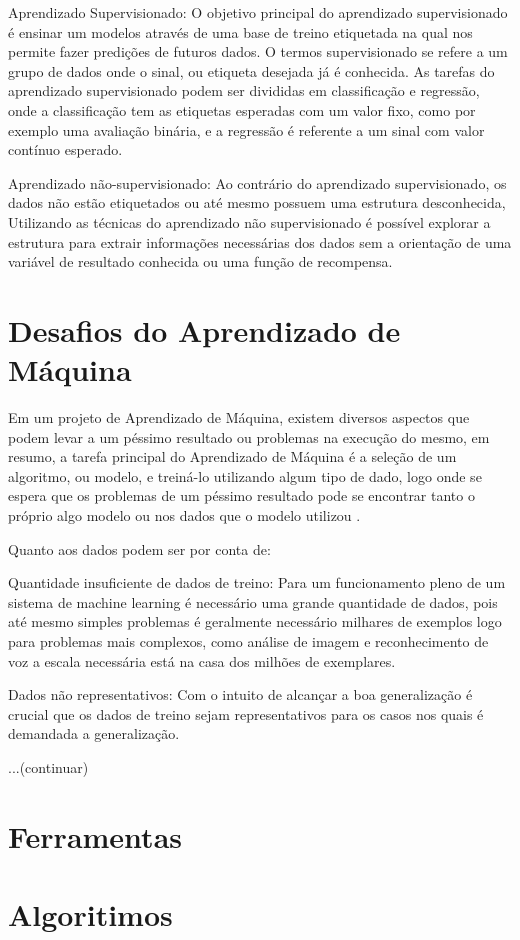 Aprendizado Supervisionado: O objetivo principal do aprendizado supervisionado é ensinar um modelos através de uma base de treino etiquetada na qual nos permite fazer predições de futuros dados. O termos supervisionado se refere a um grupo de dados onde o sinal, ou etiqueta desejada já é conhecida. As tarefas do aprendizado supervisionado podem ser divididas em classificação e regressão, onde a classificação tem as etiquetas esperadas com um valor fixo, como por exemplo uma avaliação binária, e a regressão é referente a um sinal com valor contínuo esperado.

Aprendizado não-supervisionado: Ao contrário do aprendizado supervisionado, os dados não estão etiquetados ou até mesmo possuem uma estrutura desconhecida, Utilizando as técnicas do aprendizado não supervisionado é possível explorar a estrutura para extrair informações necessárias dos dados sem a orientação de uma variável de resultado conhecida ou uma função de recompensa.

\section{Desafios do Aprendizado de Máquina}
Em um projeto de Aprendizado de Máquina, existem diversos aspectos que podem levar a um péssimo resultado ou problemas na execução do mesmo, em resumo, a tarefa principal do Aprendizado de Máquina é a seleção de um algoritmo, ou modelo, e treiná-lo utilizando algum tipo de dado, logo onde se espera que os problemas de um péssimo resultado pode se encontrar tanto o próprio algo modelo ou nos dados que o modelo utilizou \cite{Aurélien}.

Quanto aos dados podem ser por conta de:

Quantidade insuficiente de dados de treino: Para um funcionamento pleno de um sistema de machine learning  é necessário uma grande quantidade de dados, pois até mesmo simples problemas é geralmente necessário milhares de exemplos logo para problemas mais complexos, como análise de imagem e reconhecimento de voz a escala necessária está na casa dos milhões de exemplares.

Dados não representativos: Com o intuito de alcançar a boa generalização é crucial que os dados de treino sejam representativos para os casos nos quais é demandada a generalização.

...(continuar)

\section{Ferramentas}
\section{Algoritimos}




